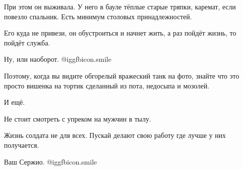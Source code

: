 При этом он выживала. У него в бауле тёплые старые тряпки, каремат, если
повезло спальник. Есть минимум столовых принадлежностей.

Его куда не привези, он обустроиться и начнет жить, а раз пойдёт жизнь, то
пойдёт служба.

Ну, или наоборот. @igg{fbicon.smile} 

Поэтому, когда вы видите обгорелый вражеский танк на фото, знайте что это
просто вишенка на тортик сделанный из пота, недосыпа и мозолей.

И ещё.

Не стоит смотреть с упреком на мужчин в тылу.

Жизнь солдата не для всех. Пускай делают свою работу где лучше у них
получается.

Ваш Сержио.  @igg{fbicon.smile} 

